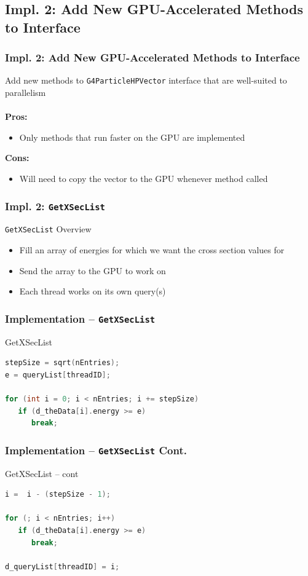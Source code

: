 \documentclass{beamer}
\newcommand\pro{\item[$+$]}
\newcommand\con{\item[$-$]}
\begin{document}
\subsection{Impl. 2: Add New GPU-Accelerated Methods to Interface}
\begin{frame}
\frametitle{Impl. 2: Add New GPU-Accelerated Methods to Interface}
Add new methods to \texttt{G4ParticleHPVector} interface that are well-suited to parallelism\\~\\

\textbf{Pros:}
\begin{itemize}
\pro Only methods that run faster on the GPU are implemented
\end{itemize}

\textbf{Cons:}
\begin{itemize}
\con Will need to copy the vector to the GPU whenever method called
\end{itemize}
\end{frame}

\begin{frame}
\frametitle{Impl. 2: \texttt{GetXSecList}}
\texttt{GetXSecList} Overview
\begin{itemize}
\item Fill an array of energies for which we want the cross section values for
\item Send the array to the GPU to work on
\item Each thread works on its own query(s)
\end{itemize}
\end{frame}

\begin{frame}[fragile]
\frametitle{Implementation -- \texttt{GetXSecList}}
\begin{block}{GetXSecList}
\begin{lstlisting}[language=C++,basicstyle=\ttfamily,keywordstyle=\color{red}]
stepSize = sqrt(nEntries);
e = queryList[threadID];
    
for (int i = 0; i < nEntries; i += stepSize) 
   if (d_theData[i].energy >= e) 
      break;
\end{lstlisting}
\end{block}
\end{frame}

\begin{frame}[fragile]
\frametitle{Implementation -- \texttt{GetXSecList} Cont.}
\begin{block}{GetXSecList -- cont}
\begin{lstlisting}[language=C++, basicstyle=\ttfamily, keywordstyle=\color{red}]
i =  i - (stepSize - 1); 

for (; i < nEntries; i++) 
   if (d_theData[i].energy >= e) 
      break;
   
d_queryList[threadID] = i;
\end{lstlisting}
\end{block}
\end{frame}
\end{document}
